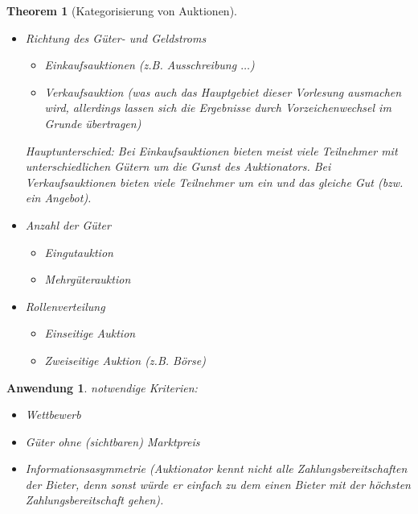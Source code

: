 \documentclass[12pt]{extreport} %
\theoremstyle{named}
\newtheorem*{unnamedtheorem*}{Theorem}
\theoremstyle{itshape}
\theoremstyle{normal}
\newtheorem{anwendung}[unnamedtheorem]{Anwendung}
\begin{document}
\newpage

\begin{unnamedtheorem*}[Kategorisierung von Auktionen] ~\
	\begin{itemize}
		\item Richtung des Güter- und Geldstroms
			\begin{itemize}
				\item Einkaufsauktionen (z.B. Ausschreibung $\dotsc$)
				\item Verkaufsauktion (was auch das Hauptgebiet dieser Vorlesung ausmachen wird, allerdings lassen sich die Ergebnisse durch Vorzeichenwechsel im Grunde übertragen)
			\end{itemize}
			Hauptunterschied: Bei Einkaufsauktionen bieten meist viele Teilnehmer mit unterschiedlichen Gütern um die Gunst des Auktionators.
			Bei Verkaufsauktionen bieten viele Teilnehmer um ein und das gleiche Gut (bzw. ein Angebot).
		\item Anzahl der Güter
			\begin{itemize}
				\item Eingutauktion
				\item Mehrgüterauktion
			\end{itemize}
		\item Rollenverteilung
			\begin{itemize}
				\item Einseitige Auktion
				\item Zweiseitige Auktion (z.B. Börse)
			\end{itemize}
	\end{itemize}
\end{unnamedtheorem*}

\begin{anwendung}
	notwendige Kriterien:
	\begin{itemize}
		\item Wettbewerb
		\item Güter ohne (sichtbaren) Marktpreis
		\item Informationsasymmetrie (Auktionator kennt nicht alle Zahlungsbereitschaften der Bieter, denn sonst würde er einfach zu dem einen Bieter mit der höchsten Zahlungsbereitschaft gehen).
	\end{itemize}
\end{anwendung}

\newpage
\end{document}
